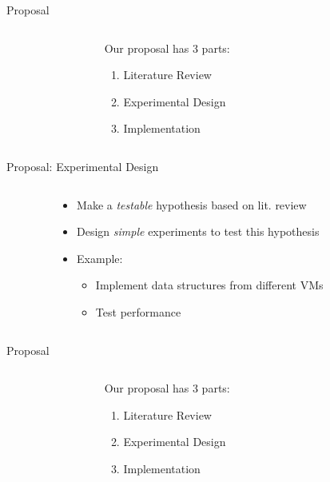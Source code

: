 \documentclass[aspectratio=169]{beamer}
\newcommand{\bi}{\begin{itemize}}
\newcommand{\ei}{\end{itemize}}
\newcommand{\bn}{\begin{enumerate}}
\newcommand{\en}{\end{enumerate}}
\begin{document}
\begin{frame}{Proposal}
  \begin{columns}[T]
    \begin{column}{0.2\textwidth}
    \end{column}
    \begin{column}{0.6\textwidth}
      Our proposal has 3 parts:
      \bn
    \item Literature Review
    \item { Experimental Design}
    \item Implementation
      \en
    \end{column}
    \begin{column}{0.2\textwidth}
    \end{column}
  \end{columns}
\end{frame}

\begin{frame}{Proposal: Experimental Design}
  \begin{columns}[T]
    \begin{column}{0.2\textwidth}
    \end{column}
    \begin{column}{0.6\textwidth}
      \bi
      \pause
    \item Make a \emph{testable} hypothesis based on lit. review
      \pause
    \item Design \emph{simple} experiments to test this hypothesis
      \pause
    \item Example:
      \bi
      \pause
    \item Implement data structures from different VMs
      \pause
    \item Test performance
      \ei
      \ei
    \end{column}
    \begin{column}{0.2\textwidth}
    \end{column}
  \end{columns}
\end{frame}

\begin{frame}{Proposal}
  \begin{columns}[T]
    \begin{column}{0.2\textwidth}
    \end{column}
    \begin{column}{0.6\textwidth}
      Our proposal has 3 parts:
      \bn
    \item Literature Review
    \item Experimental Design
    \item { Implementation}
      \en
    \end{column}
    \begin{column}{0.2\textwidth}
    \end{column}
  \end{columns}
\end{frame}
\end{document}

